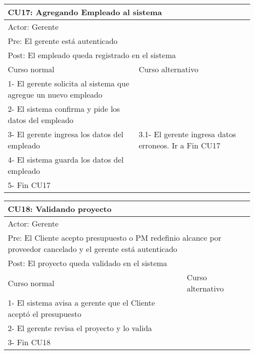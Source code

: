 \begin{table}[H]
  \begin{adjustbox}{max width = \textwidth}
  \begin{tabular}{|l|l|}
    \hline
    \multicolumn{2}{|l|}{CU17: Agregando Empleado al sistema} \\\hline
    \multicolumn{2}{|l|}{Actor: Gerente} \\\hline
    \multicolumn{2}{|l|}{Pre: El gerente está autenticado} \\\hline
    \multicolumn{2}{|l|}{Post: El empleado queda registrado en el sistema} \\\hline
     Curso normal & Curso alternativo\\ \hline
	 1- El gerente solicita al sistema que agregue un nuevo empleado & \\ \hline
	 2- El sistema confirma y pide los datos del empleado & \\ \hline
	 3- El gerente ingresa los datos del empleado & 3.1- El gerente ingresa datos erroneos. Ir a Fin CU17\\ \hline
   4- El sistema guarda los datos del empleado & \\ \hline
   5- Fin CU17 & \\ \hline
  \end{tabular}
  \end{adjustbox}
\end{table}

\begin{table}[H]
  \begin{adjustbox}{max width = \textwidth}
  \begin{tabular}{|l|l|}
    \hline
    \multicolumn{2}{|l|}{CU18: Validando proyecto} \\\hline
    \multicolumn{2}{|l|}{Actor: Gerente} \\\hline
    \multicolumn{2}{|l|}{Pre: El Cliente acepto presupuesto o PM redefinio alcance por proveedor cancelado y el gerente está autenticado} \\\hline
    \multicolumn{2}{|l|}{Post: El proyecto queda validado en el sistema} \\\hline
     Curso normal & Curso alternativo\\ \hline
	 1- El sistema avisa a gerente que el Cliente aceptó el presupuesto & \\ \hline
	 2- El gerente revisa el proyecto y lo valida & \\ \hline
   3- Fin CU18 & \\ \hline
  \end{tabular}
  \end{adjustbox}
\end{table}

